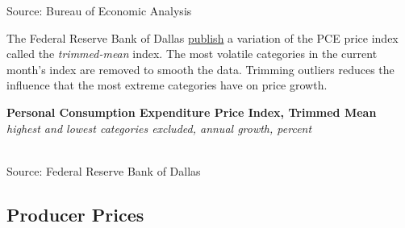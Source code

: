 \documentclass{report}
\makeatletter
\newcommand{\tbllink}[1]{\href{https://raw.githubusercontent.com/bdecon/US-chartbook/master/chartbook/data/#1}{\faTable}}
\newcommand*\short[1]{\expandafter\@gobbletwo\number\numexpr#1\relax}
\newcommand{\dateaxisticks}{
		date coordinates in=x, axis line style={draw=none},
		xmax={2022-03-15},
		max space between ticks=40,	    
		xtick={{1990-01-01}, {1992-01-01}, {1994-01-01}, 
			{1996-01-01}, {1998-01-01}, {2000-01-01}, 
			{2002-01-01}, {2004-01-01}, {2006-01-01},
			{2008-01-01}, {2010-01-01}, {2012-01-01}, {2014-01-01},
		    {2016-01-01}, {2018-01-01}, {2020-01-01}, {2022-01-01}, 
		    {2024-01-01}, {2026-01-01}},
		minor xtick={{1989-01-01}, {1991-01-01}, {1993-01-01},
			{1995-01-01}, {1997-01-01}, {1999-01-01}, 
			{2001-01-01}, {2003-01-01}, {2005-01-01}, {2007-01-01},
		    {2009-01-01}, {2011-01-01}, {2013-01-01}, {2015-01-01},
		    {2017-01-01}, {2019-01-01}, {2021-01-01}, {2023-01-01}, 
		    {2025-01-01}, {2027-01-01}},
		enlarge y limits={0.06}, enlarge x limits={0.01},
		}
\newcommand{\bbar}[2]{extra #1 ticks = {{#2}}, extra #1 tick labels = ,
		extra #1 tick style = {grid=major, grid style={thick, black!25}},}
\newcommand{\stdline}[4]{\addplot[very thick, no markers, color=#1] 
		table [x=#2, y=#3, col sep=comma] {#4};	}
\newcommand{\rbars}{
		\fill[color=black!10] (axis cs:{1990-07-01},\pgfkeysvalueof{/pgfplots/ymin}) rectangle 
			(axis cs:{1991-03-01}, \pgfkeysvalueof{/pgfplots/ymax});
		\fill[color=black!10] (axis cs:{2007-12-01},\pgfkeysvalueof{/pgfplots/ymin}) rectangle 
			(axis cs:{2009-07-01}, \pgfkeysvalueof{/pgfplots/ymax});
		\fill[color=black!10] (axis cs:{2001-03-01},\pgfkeysvalueof{/pgfplots/ymin}) rectangle 
			(axis cs:{2001-11-01}, \pgfkeysvalueof{/pgfplots/ymax});
		\fill[color=black!10] (axis cs:{2020-02-01},\pgfkeysvalueof{/pgfplots/ymin}) rectangle 
			(axis cs:{2020-05-01}, \pgfkeysvalueof{/pgfplots/ymax});}
\makeatother
\begin{document}
{{\begin{minipage}{0.76\textwidth}
\hspace{3mm} 

\footnotesize{Source: Bureau of Economic Analysis} \hfill \tbllink{pce_pi.csv}
\vspace{5mm}

\small The Federal Reserve Bank of Dallas \href{https://www.dallasfed.org/research/pce}{publish} a variation of the PCE price index called the \textit{trimmed-mean} index. The most volatile categories in the current month's index are removed to smooth the data. Trimming outliers reduces the influence that the most extreme categories have on price growth. 


\vspace{1mm}

\normalsize \textbf{Personal Consumption Expenditure Price Index, Trimmed Mean}\\
\footnotesize{\textit{highest and lowest categories excluded, annual growth, percent}}\\
\hspace{-2mm} \\
\footnotesize{Source: Federal Reserve Bank of Dallas} \hfill \tbllink{pce_tm12.csv}
\end{minipage} 
\newpage
\begin{minipage}{0.76\textwidth}
\subsection*{Producer Prices}


\end{minipage}}}
\end{document}
